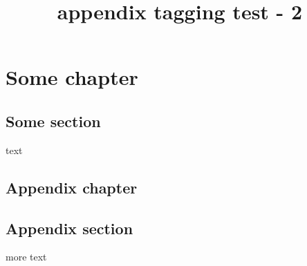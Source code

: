 \documentclass{report}
\title{appendix tagging test - 2}
\begin{document}
\tableofcontents

\chapter{Some chapter}
\section{Some section}
text

\begin{appendices}
\chapter{Appendix chapter}
\section{Appendix section}
more text
\end{appendices}
\end{document}
